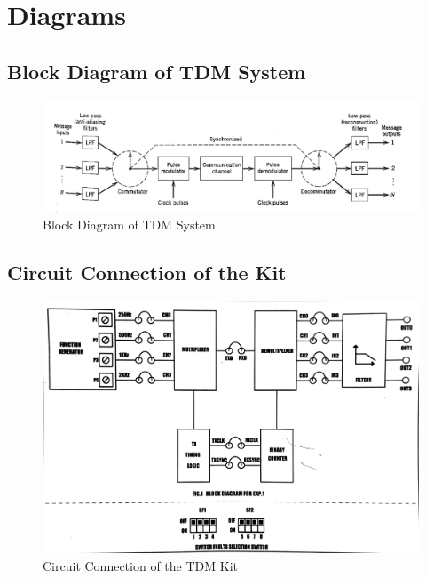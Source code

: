 \documentclass[12pt]{article}
\begin{document}
\section*{Diagrams}
\subsection*{Block Diagram of TDM System}
\begin{figure}[H]
    \centering
    \includegraphics[width=.95\textwidth]{ckt.png}
    \caption{Block Diagram of TDM System \cite{haykin_communication_systems}}
    \label{fig:ckt}
\end{figure}

\subsection*{Circuit Connection of the Kit}
\begin{figure}[H]
    \centering
    \includegraphics[width=.8\textwidth]{kit.png}
    \caption{Circuit Connection of the TDM Kit}
    \label{fig:circuit_connection}
\end{figure}
\end{document}
